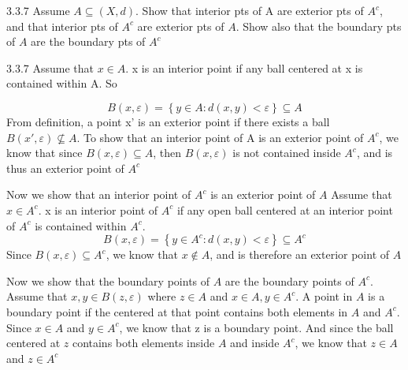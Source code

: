\documentclass[a4paper,norsk]{article}
\renewcommand{\epsilon}{\varepsilon}
\begin{document}
\begin{oppgavebox}{3.3.7}{}
Assume $ A \subseteq \left( X, d \right)  $. Show that interior pts of A are exterior pts of $ A^c $, and that interior pts of $ A^c $ are exterior pts of $ A $. Show also that the boundary pts of $ A $ are the boundary pts of $ A^c $ 

\begin{proofbox}{3.3.7}{}
  Assume that $ x \in  A $. x is an interior point if any ball centered at x is contained within A. So
  
  \[
      B(x, \epsilon ) = \left\{ y \in  A : d(x, y) < \epsilon  \right\} \subseteq A
  \]
  From definition, a point x' is an exterior point if there exists a ball $ B \left( x', \epsilon  \right) \not \subseteq A  $. To show that an interior point of A is an exterior point of $ A^c $, we know that since $ B \left( x, \epsilon  \right) \subseteq A  $, then $ B \left( x, \epsilon  \right)  $ is not contained inside $ A^c $, and is thus an exterior point of $ A^c $       
  

  Now we show that an interior point of $ A^c $ is an exterior point of $ A $  Assume that  $ x \in A^c $. x is an interior point of $ A^c $ if any open ball centered at an interior point of $ A^c $ is contained within $ A^c $. 
  \[
      B \left( x, \epsilon \right) = \left\{ y \in A^c : d(x, y) < \epsilon   \right\} \subseteq A^c
  \]
  Since $ B \left( x, \epsilon  \right) \subseteq A^c  $, we know that $ x \notin A $, and is therefore an exterior point of $ A $ 


  Now we show that the boundary points of $ A $ are the boundary points of $ A^c $. Assume that $ x, y \in B \left( z, \epsilon  \right)  $ where $ z \in A $ and $ x \in A, y \in A^c $. A point in $ A $  is a boundary point if the centered at that point contains both elements in $ A $ and $ A^c $. Since $ x \in A $ and $ y \in A^c $, we know that z is a boundary point. And since the ball centered at $ z $ contains both elements inside $ A $ and inside $ A^c $, we know that $ z \in A $ and $ z \in A^c $ 
  
\end{proofbox}
\end{oppgavebox}
\end{document}
